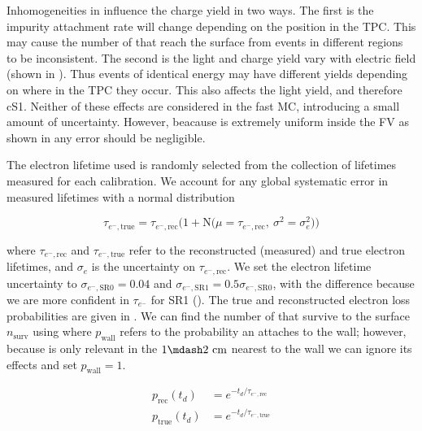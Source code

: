 Inhomogeneities in \ed influence the charge yield in two ways.  The first is the impurity attachment rate will change depending on the
position in the TPC.   This may cause the number of \electron that reach the surface from events in different regions to be
inconsistent.  The second is the light and charge yield vary with electric field (shown in
).  Thus events of identical energy may have
different yields depending on where in the TPC they occur.  This also affects the light yield, and therefore cS1.  Neither of these
effects are considered
in the fast MC, introducing a small amount of uncertainty.  However, beacause \ed is extremely uniform inside the FV as shown in
 any error should be negligible.

The electron lifetime used is randomly selected from the collection of lifetimes measured for each calibration.  We account for any global
systematic error in measured lifetimes  with a normal distribution

\begin{equation}
\tau_{e^-, \mathrm{true}} = \tau_{e^-, \mathrm{rec}} \bigg( 1 + \mathrm{N} \big( \mu = \tau_{e^-, \mathrm{rec}},\ \sigma^2 = \sigma_{e}^2
\big)
\bigg)
\end{equation}

\noindent where $\tau_{e^-, \mathrm{rec}}$ and $\tau_{e^-, \mathrm{true}}$ refer to the reconstructed (measured) and true electron
lifetimes, and $\sigma_e$ is the uncertainty on $\tau_{e^-, \mathrm{rec}}$.  We set the electron lifetime uncertainty to 
$\sigma_{e^-, \mathrm{SR0}} = 0.04$ and $\sigma_{e^-, \mathrm{SR1}} = 0.5 \sigma_{e^-, \mathrm{SR0}}$, with the difference because we are
more
confident in $\tau_{e^-}$ for SR1 ().  The true and reconstructed electron loss probabilities
are given in
.  We can find the number of \electron that survive to the surface
$n_{\mathrm{surv}}$ using  where $p_{\mathrm{wall}}$ refers to
the probability an \electron attaches to the wall; however, because is only relevant in the $1 \mdash 2\ \mathrm{cm}$ nearest to the wall
we can ignore its effects and set $p_{\mathrm{wall}} = 1$.


\begin{equation}
\begin{aligned}
p_{\mathrm{rec}} (t_d) &= e^{-t_d / \tau_{e^-, \mathrm{rec}}} \\
p_{\mathrm{true}} (t_d) &= e^{-t_d / \tau_{e^-, \mathrm{true}}}
\end{aligned}
\label{eq:er_nr_calibrations_parameter_determ_det_phys_prob_elifetime}
\end{equation}

